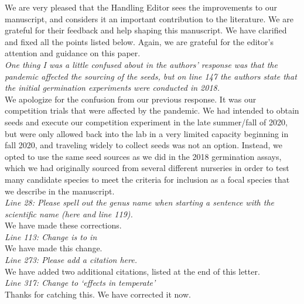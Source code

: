 \documentclass[12 pt]{article}
\begin{document}
\noindent We are very pleased that the Handling Editor sees the improvements to our manuscript, and considers it an important contribution to the literature. We are grateful for their feedback and help shaping this manuscript. We have clarified and fixed all the points listed below. Again, we are grateful for the editor's attention and guidance on this paper.\\

\noindent \emph{One thing I was a little confused about in the authors’ response was that the pandemic affected the sourcing of the seeds, but on line 147 the authors state that the initial germination experiments were conducted in 2018.}\\

\noindent We apologize for the confusion from our previous response. It was our competition trials that were affected by the pandemic. We had intended to obtain seeds and execute our competition experiment in the late summer/fall of 2020, but were only allowed back into the lab in a very limited capacity beginning in fall 2020, and traveling widely to collect seeds was not an option. Instead, we opted to use the same seed sources as we did in the 2018 germination assays, which we had originally sourced from several different nurseries in order to test many candidate species to meet the criteria for inclusion as a focal species that we describe in the manuscript.\\

\noindent \emph{Line 28: Please spell out the genus name when starting a sentence with the scientific name (here and line 119).}\\

\noindent We have made these corrections.\\

\noindent \emph{Line 113: Change is to in}\\

\noindent We have made this change.\\

\noindent \emph {Line 273: Please add a citation here.}\\

\noindent We have added two additional citations, listed at the end of this letter.\\

\noindent \emph{Line 317: Change to `effects in temperate'}\\

\noindent Thanks for catching this. We have corrected it now.\\
\end{document}
